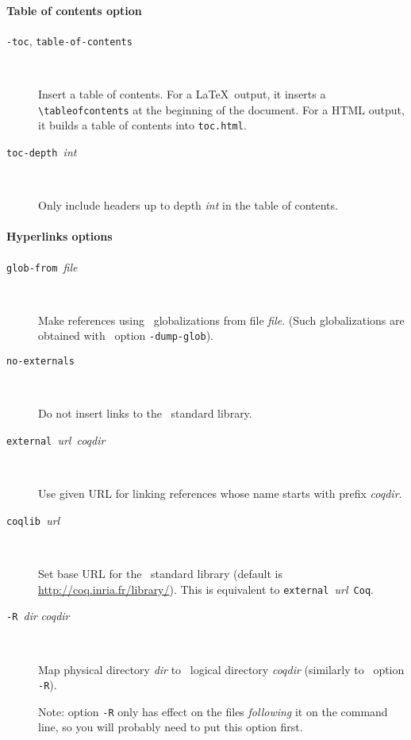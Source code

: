 \paragraph{Table of contents option}

\begin{description}

\item[\texttt{-toc}, \texttt{\mm{}table-of-contents}] ~\par

  Insert a table of contents.
  For a \LaTeX\ output, it inserts a \verb!\tableofcontents! at the
  beginning of the document. For a HTML output, it builds a table of
  contents into \texttt{toc.html}.

\item[\texttt{\mm{}toc-depth }\textit{int}] ~\par

  Only include headers up to depth \textit{int} in the table of
  contents.

\end{description}

\paragraph{Hyperlinks options}
\begin{description}

\item[\texttt{\mm{}glob-from }\textit{file}] ~\par

  Make references using \Coq\ globalizations from file \textit{file}.
  (Such globalizations are obtained with \Coq\ option \texttt{-dump-glob}).

\item[\texttt{\mm{}no-externals}] ~\par

  Do not insert links to the \Coq\ standard library.

\item[\texttt{\mm{}external }\textit{url}~\textit{coqdir}] ~\par

  Use given URL for linking references whose name starts with prefix
  \textit{coqdir}.

\item[\texttt{\mm{}coqlib }\textit{url}] ~\par

  Set base URL for the \Coq\ standard library (default is
  \url{http://coq.inria.fr/library/}). This is equivalent to
  \texttt{\mm{}external }\textit{url}~\texttt{Coq}.

\item[\texttt{-R }\textit{dir }\textit{coqdir}] ~\par

  Map physical directory \textit{dir} to \Coq\ logical directory
  \textit{coqdir} (similarly to \Coq\ option \texttt{-R}).

  Note: option \texttt{-R} only has effect on the files
  \emph{following} it on the command line, so you will probably need
  to put this option first.

\end{description}

